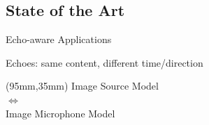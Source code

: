 \subsection{State of the Art}

\begin{frame}[t]{Echo-aware Applications \hfill\faBook}

    \begin{block}{Echoes: same content, different time/direction}
        \centering
    \end{block}

    \pause[4]
    \begin{textblock*}{30mm}(95mm,35mm)
        \centering
        \small
        \textcolor{myred}{%
            Image Source Model
            \\$\Leftrightarrow$
            \\Image Microphone Model}
    \end{textblock*}


\end{frame}
